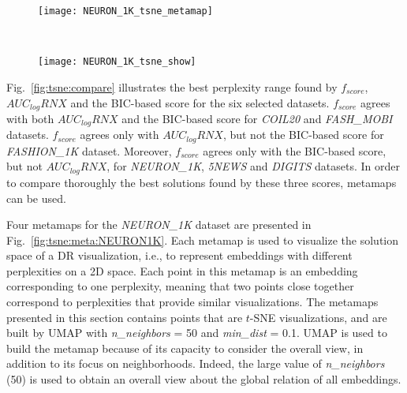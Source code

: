 \begin{figure*}[]%
    \centering
    \begin{subfigure}[b]{.8\linewidth}
        \texttt{[image: NEURON\_1K\_tsne\_metamap]}
    \end{subfigure}
    ~
    \begin{subfigure}[b]{.8\linewidth}
        \texttt{[image: NEURON\_1K\_tsne\_show]}
    \end{subfigure}
    \caption{Metamap and sample visualizations for the selected parameters for \emph{NEURON\_1K} dataset.}
    \label{fig:tsne:meta:NEURON1K}
\end{figure*}

Fig.~\ref{fig:tsne:compare} illustrates the best perplexity range found by $f_{score}$, $AUC_{log}RNX$ and the BIC-based score for the six selected datasets.
$f_{score}$ agrees with both $AUC_{log}RNX$ and the BIC-based score for \emph{COIL20} and \emph{FASH\_MOBI} datasets.
$f_{score}$ agrees only with $AUC_{log}RNX$, but not the BIC-based score for \emph{FASHION\_1K} dataset.
Moreover, $f_{score}$ agrees only with the BIC-based score, but not $AUC_{log}RNX$, for \emph{NEURON\_1K}, \emph{5NEWS} and \emph{DIGITS} datasets.
In order to compare thoroughly the best solutions found by these three scores, metamaps can be used.

Four metamaps for the \emph{NEURON\_1K} dataset are presented in Fig.~\ref{fig:tsne:meta:NEURON1K}. Each metamap is used to visualize the solution space of a DR visualization, i.e., to represent embeddings with different perplexities on a 2D space.
Each point in this metamap is an embedding corresponding to one perplexity, meaning that two points close together correspond to perplexities that provide similar visualizations.
The metamaps presented in this section contains points that are $t$-SNE visualizations, and are built by UMAP with \emph{n\_neighbors} = 50 and \emph{min\_dist} = 0.1.
UMAP is used to build the metamap because of its capacity to consider the overall view, in addition to its focus on neighborhoods. Indeed, the large value of \emph{n\_neighbors} (50) is used to obtain an overall view about the global relation of all embeddings.

